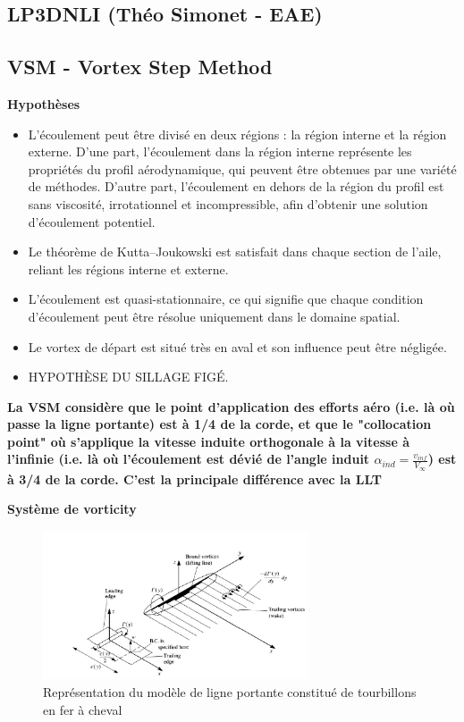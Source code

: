 \subsection{LP3DNLI (Théo Simonet - EAE)} 
\label{subsec:Ch1.2.2}

\subsection{VSM - Vortex Step Method} 
\label{subsec:Ch1.2.3}

\textbf{Hypothèses} \\
\begin{itemize}
    \item L'écoulement peut être divisé en deux régions : la région interne et la région externe. D'une part, l'écoulement dans la région interne représente les propriétés du profil aérodynamique, qui peuvent être obtenues par une variété de méthodes. D'autre part, l'écoulement en dehors de la région du profil est sans viscosité, irrotationnel et incompressible, afin d'obtenir une solution d'écoulement potentiel.
    \item Le théorème de Kutta–Joukowski est satisfait dans chaque section de l'aile, reliant les régions interne et externe.
    \item L'écoulement est quasi-stationnaire, ce qui signifie que chaque condition d'écoulement peut être résolue uniquement dans le domaine spatial.
    \item Le vortex de départ est situé très en aval et son influence peut être négligée.
    \item HYPOTHÈSE DU SILLAGE FIGÉ.
\end{itemize}

\textbf{La VSM considère que le point d'application des efforts aéro (i.e. là où passe la ligne portante) est à 1/4 de la corde, et que le "collocation point" où s'applique la vitesse induite orthogonale à la vitesse à l'infinie (i.e. là où l'écoulement est dévié de l'angle induit $\alpha_{ind} = \frac{v_{inf}}{V_{\infty}}$) est à 3/4 de la corde. C'est la principale différence avec la LLT}

\textbf{Système de vorticity}
\begin{figure}[H]
    \centering
    \includegraphics[width=0.7\textwidth]{Pics/01 - Basses Fidélités/vortex VSM.png}
    \caption{Représentation du modèle de ligne portante constitué de tourbillons en fer à cheval}
    \label{fig: vortex vsm}
\end{figure}


